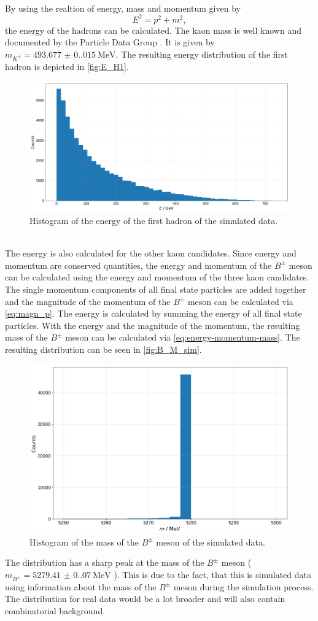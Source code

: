 \\ By using the realtion of energy, mass and momentum given by 
\begin{equation}
  \label{eq:energy-momentum-mass}
  E^2 = p^2 + m^2,
\end{equation}
the energy of the hadrons can be calculated. The kaon mass is well known and documented by the Particle Data Group \cite{PDG}.
It is given by $m_{K^{\pm}} = \qty{493.677(0.015)}{\mega\electronvolt}$. The resulting energy distribution of the first hadron is depicted in  \autoref{fig:E_H1}.
\begin{figure}
  \centering
  \includegraphics[width = .7\textwidth]{"content/pics/E_H1.png"}
  \caption{Histogram of the energy of the first hadron of the simulated data.}
  \label{fig:E_H1}
\end{figure}
\\The energy is also calculated for the other kaon candidates. Since energy and momentum are conserved quantities, the energy and momentum of the $B^{\pm}$ meson can be calculated
using the energy and momentum of the three kaon candidates. The single momentum components of all final state particles are added together and the magnitude of the momentum of the $B^{\pm}$
meson can be calculated via \autoref{eq:magn_p}. The energy is calculated by summing the energy of all final state particles. With the energy and the magnitude of the momentum, the resulting
mass of the $B^{\pm}$ meson can be calculated via \autoref{eq:energy-momentum-mass}. The resulting distribution can be seen in \autoref{fig:B_M_sim}.
\begin{figure}
  \centering
  \includegraphics[width = .6\textwidth]{"content/pics/B_M_sim.png"}
  \caption{Histogram of the mass of the $B^{\pm}$ meson of the simulated data.}
  \label{fig:B_M_sim}
\end{figure}
The distribution has a sharp peak at the mass of the $B^{\pm}$ meson ($m_{B^{\pm}} = \qty{5279.41(0.07)}{\mega\electronvolt}$ \cite{PDG}). This is due to the fact, that this is simulated data using information about the mass of the $B^{\pm}$ meson during
the simulation process. The distribution for real data would be a lot broader and will also contain combinatorial background.

